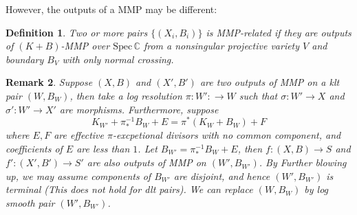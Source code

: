 \documentclass{article}
\newtheorem{defn}{Definition}[section]
\newtheorem{rmk}[defn]{Remark}
\begin{document}
However, the outputs of a MMP may be different:
\begin{defn}
	Two or more pairs $ \{(X_i,B_i)\} $ is MMP-related if they are outputs of $ (K+B) $-MMP over $ \mathrm{Spec}\,\mathbb{C} $ from a nonsingular  projective variety $ V $ and  boundary $ B_V $ with only normal crossing.
\end{defn}
\begin{rmk}
	Suppose $(X,B) $ and $ (X',B') $ are two  outputs of MMP on a klt pair $ (W,B_W) $, then take a log resolution $ \pi:W':\to W $ such that $ \sigma:W'\to X $ and $ \sigma':W'\to X' $ are morphisms. Furthermore, suppose
	$$ K_{W'}+\pi_*^{-1}B_W+E=\pi^*(K_W+B_W)+F $$
	where $ E,F $ are effective $ \pi $-excpetional divisors with no common component, and coefficients of $ E $ are less than $ 1 $. Let $ B_{W'}=\pi_*^{-1}B_W+E $, then $ f:(X,B)\to S $ and $ f':(X',B')\to S' $ are also  outputs of MMP on $ (W',B_{W'}) $. By Further blowing up, we may assume components of $ B_{W'} $ are disjoint, and hence $ (W',B_{W'}) $ is terminal (This does not hold for dlt pairs).  We can replace $ (W,B_W) $ by log smooth pair $ (W',B_{W'}) $. 
\end{rmk}
\end{document}
